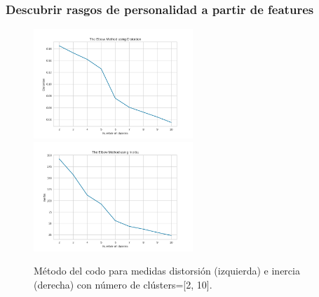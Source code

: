 \documentclass[10pt, a4paper]{article}
\begin{document}
		\subsubsection{Descubrir rasgos de personalidad a partir de features}
    	
    		\begin{figure}[hbt!]
    		\centering
    		\includegraphics[width = 6cm]{ElbowM_Distortion.png}
    		\includegraphics[width = 6cm]{ElbowM_Inertia.png}
    		\caption{M\'etodo del codo para medidas distorsi\'on (izquierda) e inercia (derecha) con n\'umero de cl\'usters=[2, 10].}
    	\end{figure}
    	
\end{document}
